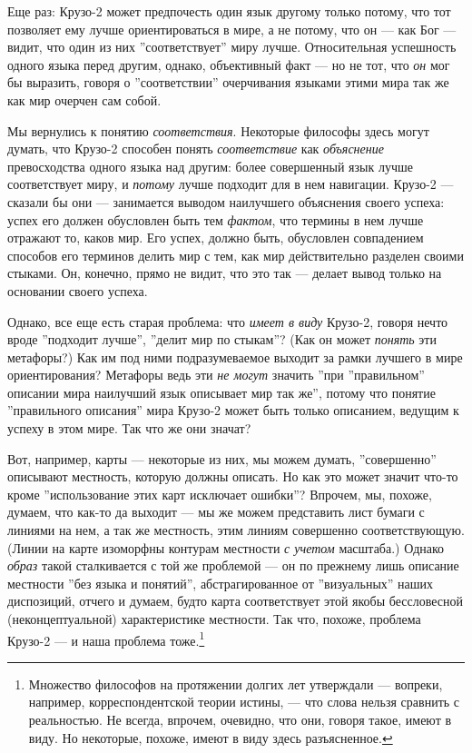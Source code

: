 \documentclass[11pt]{book}
\begin{document}
Еще раз: Крузо-2 может предпочесть один язык другому только потому, что тот позволяет ему лучше ориентироваться в мире, а не потому, что он --- как Бог --- видит, что один из них ''соответствует'' миру лучше. Относительная успешность одного языка перед другим, однако, объективный факт --- но не тот, что \textit{он} мог бы выразить, говоря о ''соответствии'' очерчивания языками этими мира так же как мир очерчен сам собой.

Мы вернулись к понятию \textit{соответствия}. Некоторые философы здесь могут думать, что Крузо-2 способен понять \textit{соответствие} как \textit{объяснение} превосходства одного языка над другим: более совершенный язык лучше соответствует миру, и \textit{потому} лучше подходит для в нем навигации. Крузо-2 --- сказали бы они --- занимается выводом наилучшего объяснения своего успеха: успех его должен обусловлен быть тем \textit{фактом}, что термины в нем лучше отражают то, каков мир. Его успех, должно быть, обусловлен совпадением способов его терминов делить мир с тем, как мир действительно разделен своими стыками. Он, конечно, прямо не видит, что это так --- делает вывод только на основании своего успеха.

Однако, все еще есть старая проблема: что \textit{имеет в виду} Крузо-2, говоря нечто вроде ''подходит лучше'', ''делит мир по стыкам''? (Как он может \textit{понять} эти метафоры?) Как им под ними подразумеваемое выходит за рамки лучшего в мире ориентирования? Метафоры ведь эти \textit{не могут} значить ''при ''правильном'' описании мира наилучший язык описывает мир так же'', потому что понятие ''правильного описания'' мира Крузо-2 может быть только описанием, ведущим к успеху в этом мире. Так что же они значат?

Вот, например, карты --- некоторые из них, мы можем думать, ''совершенно'' описывают местность, которую должны описать. Но как это может значит что-то кроме ''использование этих карт исключает ошибки''? Впрочем, мы, похоже, думаем, что как-то да выходит --- мы же можем представить лист бумаги с линиями на нем, а так же местность, этим линиям совершенно соответствующую. (Линии на карте изоморфны контурам местности \textit{с учетом} масштаба.) Однако \textit{образ} такой сталкивается с той же проблемой --- он по прежнему лишь описание местности ''без языка и понятий'', абстрагированное от ''визуальных'' наших диспозиций, отчего и думаем, будто карта соответствует этой якобы бессловесной (неконцептуальной) характеристике местности. Так что, похоже, проблема Крузо-2 --- и наша проблема тоже.\footnote{Множество философов на протяжении долгих лет утверждали --- вопреки, например, корреспондентской теории истины, --- что слова нельзя сравнить с реальностью. Не всегда, впрочем, очевидно, что они, говоря такое, имеют в виду. Но некоторые, похоже, имеют в виду здесь разъясненное.}
\end{document}
